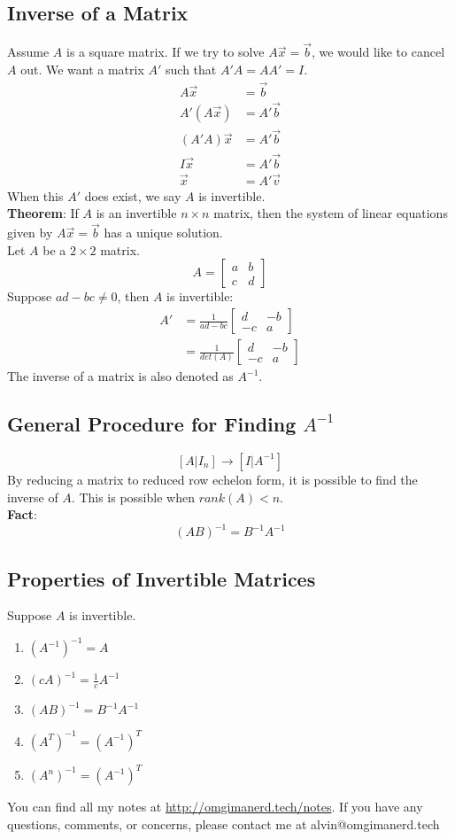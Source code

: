 \documentclass[letterpaper, 12pt]{math}
\begin{document}
\subsection*{Inverse of a Matrix}
Assume \( A \) is a square matrix. If we try to solve \( A\vec{x} = \vec{b} \),
we would like to cancel \( A \) out. We want a matrix \( A' \) such that
\( A'A = AA' = I \).
\begin{align*}
  A\vec{x} &= \vec{b} \\
  A'(A\vec{x}) &= A'\vec{b} \\
  (A'A)\vec{x} &= A'\vec{b} \\
  I\vec{x} &= A'\vec{b} \\
  \vec{x} &= A'\vec{v}
\end{align*}
When this \( A' \) does exist, we say \( A \) is invertible. \\
\textbf{Theorem}: If \( A \) is an invertible \( n\times n \) matrix, then the
system of linear equations given by \( A\vec{x} = \vec{b} \) has a unique
solution. \\
Let \( A \) be a \( 2\times2 \) matrix.
\[ A = \begin{bmatrix}a & b \\ c & d\end{bmatrix} \]
Suppose \( ad-bc \ne 0 \), then \( A \) is invertible:
\begin{align*}
  A' &= \frac{1}{ad-bc}\begin{bmatrix}d & -b \\ -c & a\end{bmatrix} \\
  &= \frac{1}{det(A)}\begin{bmatrix}d & -b \\ -c & a\end{bmatrix}
\end{align*}
The inverse of a matrix is also denoted as \( A^{-1} \).

\subsection*{General Procedure for Finding \( A^{-1} \)}
\[ [A|I_n] \rightarrow [I|A^{-1}] \]
By reducing a matrix to reduced row echelon form, it is possible to find the
inverse of \( A \). This is possible when \( rank(A) < n \). \\
\textbf{Fact}:
\[ (AB)^{-1} = B^{-1}A^{-1} \]

\subsection*{Properties of Invertible Matrices}
Suppose \( A \) is invertible.
\begin{enumerate}
  \item \( (A^{-1})^{-1} = A \)
  \item \( (cA)^{-1} = \frac{1}{c}A^{-1} \)
  \item \( (AB)^{-1} = B^{-1}A^{-1} \)
  \item \( (A^T)^{-1} = (A^{-1})^T \)
  \item \( (A^n)^{-1} = (A^{-1})^T \)
\end{enumerate}

\begin{center}
  You can find all my notes at \url{http://omgimanerd.tech/notes}. If you have
  any questions, comments, or concerns, please contact me at
  alvin@omgimanerd.tech
\end{center}
\end{document}
